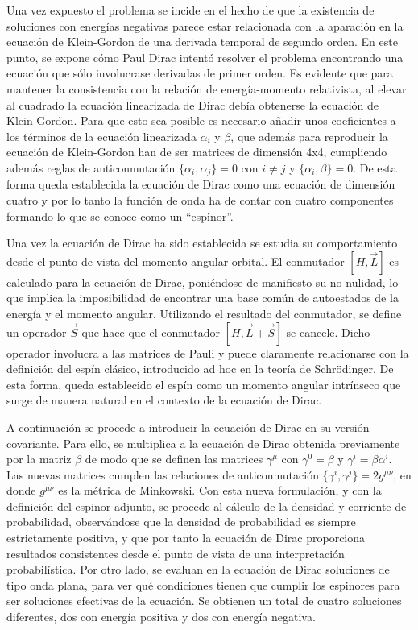 Una vez expuesto el problema se incide en el hecho de que la existencia de soluciones con energías negativas parece estar relacionada con la aparación en la ecuación de Klein-Gordon de una derivada temporal de segundo orden. En este punto, se expone cómo Paul Dirac intentó resolver el problema encontrando una ecuación que sólo involucrase derivadas de primer orden. Es evidente que para mantener la consistencia con la relación de energía-momento relativista, al elevar al cuadrado la ecuación linearizada de Dirac debía obtenerse la ecuación de Klein-Gordon. Para que esto sea posible es necesario añadir unos coeficientes a los términos de la ecuación linearizada $\alpha_i$ y $\beta$, que además para reproducir la ecuación de Klein-Gordon han de ser matrices de dimensión 4x4, cumpliendo además reglas de anticonmutación $\{\alpha_i, \alpha_j\}=0$ con $i\neq j$ y $\{\alpha_i, \beta\}=0$. De esta forma queda establecida la ecuación de Dirac como una ecuación de dimensión cuatro y por lo tanto la función de onda ha de contar con cuatro componentes formando lo que se conoce como un ``espinor''.

Una vez la ecuación de Dirac ha sido establecida se estudia su comportamiento desde el punto de vista del momento angular orbital. El conmutador $[H, \vec{L}]$ es calculado para la ecuación de Dirac, poniéndose de manifiesto su no nulidad, lo que implica la imposibilidad de encontrar una base común de autoestados de la energía y el momento angular. Utilizando el resultado del conmutador, se define un operador $\vec{S}$ que hace que el conmutador $[H, \vec{L}+\vec{S}]$ se cancele. Dicho operador involucra a las matrices de Pauli y puede claramente relacionarse con la definición del espín clásico, introducido ad hoc en la teoría de Schrödinger. De esta forma, queda establecido el espín como un momento angular intrínseco que surge de manera natural en el contexto de la ecuación de Dirac.    

A continuación se procede a introducir la ecuación de Dirac en su versión covariante. Para ello, se multiplica a la ecuación de Dirac obtenida previamente por la matriz $\beta$ de modo que se definen las matrices $\gamma^{\mu}$ con $\gamma^0=\beta$ y $\gamma^i=\beta\alpha^i$. Las nuevas matrices cumplen las relaciones de anticonmutación $\{\gamma^i, \gamma^j\}=2g^{\mu\nu}$, en donde $g^{\mu\nu}$ es la métrica de Minkowski. Con esta nueva formulación, y con la definición del espinor adjunto, se procede al cálculo de la densidad y corriente de probabilidad, observándose que la densidad de probabilidad es siempre estrictamente positiva, y que por tanto la ecuación de Dirac proporciona resultados consistentes desde el punto de vista de una interpretación probabilística. Por otro lado, se evaluan en la ecuación de Dirac soluciones de tipo onda plana, para ver qué condiciones tienen que cumplir los espinores para ser soluciones efectivas de la ecuación. Se obtienen un total de cuatro soluciones diferentes, dos con energía positiva y dos con energía negativa.

